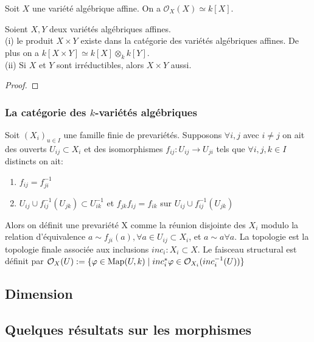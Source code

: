 \begin{cor}
Soit $X$ une variété algébrique affine. On a $\mathcal{O}_X(X)\simeq k[X]$.
\end{cor}



\begin{prop}Soient $X,Y$ deux variétés algébriques affines.\\
(i) le produit $X\times Y$ existe dans la catégorie des variétés algébriques affines. De plus on a $k[X\times Y]\simeq k[X]\otimes _k k[Y]$.\\
(ii) Si $X$ et $Y$ sont irréductibles, alors $X\times Y$ aussi.
\end{prop}
\begin{proof}

\end{proof}

\subsubsection{La catégorie des $k$-variétés algébriques}

\begin{cons}\label{gluevar}
Soit $(X_i)_{u\in I}$ une famille finie de prevariétés. Supposons $\forall i,j$ avec $i\neq j$ on ait des ouverts $U_{ij}\subset X_i$ et des isomorphismes $f_{ij}:U_{ij}\rightarrow U_{ji}$ tels que $\forall i,j,k\in I$ distincts on ait:
	\begin{enumerate}
	\item $f_{ij}=f_{ji}^{-1}$
	\item $U_{ij}\cup f_{ij}^{-1}(U_{jk})\subset U_{ik}^{-1}$ et $f_{jk}f_{ij}=f_{ik}$ sur $U_{ij}\cup f_{ij}^{-1}(U_{jk})$
	\end{enumerate}
Alors on définit une prevariété X comme la réunion disjointe des $X_i$ modulo la relation d'équivalence $a\sim f_{ji}(a),\forall a\in U_{ij}\subset X_i$, et $a\sim a \forall a$. La topologie est la topologie finale associée aux inclusions $inc_i:X_i\subset X$. Le faisceau structural est définit par $\mathcal{O}_X(U):=\lbrace \varphi\in \textrm{Map}(U,k)\mid inc_i^*\varphi\in\mathcal{O}_{X_i}(inc_i^{-1}(U))\rbrace$
\end{cons}


\subsection{Dimension}
\subsection{Quelques résultats sur les morphismes}
